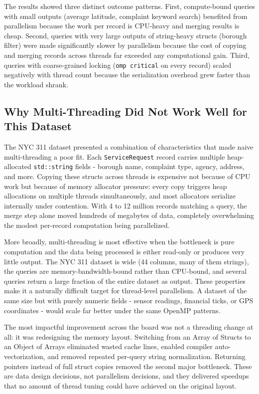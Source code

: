 \documentclass[12pt]{article}
\begin{document}
The results showed three distinct outcome patterns. First, compute-bound
queries with small outputs (average latitude, complaint keyword search)
benefited from parallelism because the work per record is CPU-heavy and
merging results is cheap. Second, queries with very large outputs of
string-heavy structs (borough filter) were made significantly slower by
parallelism because the cost of copying and merging records across threads far
exceeded any computational gain. Third, queries with coarse-grained locking
(\texttt{omp critical} on every record) scaled negatively with thread count
because the serialization overhead grew faster than the workload shrank.

\subsection*{Why Multi-Threading Did Not Work Well for This Dataset}

The NYC 311 dataset presented a combination of characteristics that made
naive multi-threading a poor fit. Each \texttt{ServiceRequest} record carries
multiple heap-allocated \texttt{std::string} fields - borough name, complaint
type, agency, address, and more. Copying these structs across threads
is expensive not because of CPU work but because of memory allocator pressure:
every copy triggers heap allocations on multiple threads simultaneously, and
most allocators serialize internally under contention. With 4 to 12 million
records matching a query, the merge step alone moved hundreds of megabytes of
data, completely overwhelming the modest per-record computation being
parallelized.

More broadly, multi-threading is most effective when the bottleneck is pure
computation and the data being processed is either read-only or produces very
little output. The NYC 311 dataset is wide (44 columns, many of them strings),
the queries are memory-bandwidth-bound rather than CPU-bound, and several
queries return a large fraction of the entire dataset as output. These
properties make it a naturally difficult target for thread-level parallelism.
A dataset of the same size but with purely numeric fields - sensor readings,
financial ticks, or GPS coordinates - would scale far better under the same
OpenMP patterns.

The most impactful improvement across the board was not a threading change at
all: it was redesigning the memory layout. Switching from an Array of Structs
to an Object of Arrays eliminated wasted cache lines, enabled compiler
auto-vectorization, and removed repeated per-query string normalization.
Returning pointers instead of full struct copies removed the second major
bottleneck. These are data design decisions, not parallelism decisions, and
they delivered speedups that no amount of thread tuning could have achieved on
the original layout.
\end{document}
